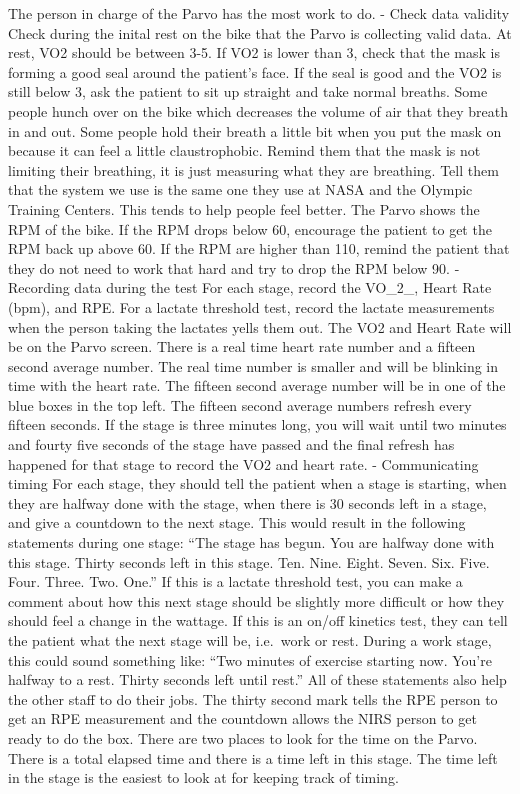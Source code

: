 \documentclass[
]{book}
\begin{document}
The person in charge of the Parvo has the most work to do.
- Check data validity
Check during the inital rest on the bike that the Parvo is collecting valid data. At rest, VO2 should be between 3-5. If VO2 is lower than 3, check that the mask is forming a good seal around the patient's face. If the seal is good and the VO2 is still below 3, ask the patient to sit up straight and take normal breaths. Some people hunch over on the bike which decreases the volume of air that they breath in and out. Some people hold their breath a little bit when you put the mask on because it can feel a little claustrophobic. Remind them that the mask is not limiting their breathing, it is just measuring what they are breathing. Tell them that the system we use is the same one they use at NASA and the Olympic Training Centers. This tends to help people feel better.
The Parvo shows the RPM of the bike. If the RPM drops below 60, encourage the patient to get the RPM back up above 60. If the RPM are higher than 110, remind the patient that they do not need to work that hard and try to drop the RPM below 90.
- Recording data during the test
For each stage, record the VO\_2\_, Heart Rate (bpm), and RPE. For a lactate threshold test, record the lactate measurements when the person taking the lactates yells them out. The VO2 and Heart Rate will be on the Parvo screen. There is a real time heart rate number and a fifteen second average number. The real time number is smaller and will be blinking in time with the heart rate. The fifteen second average number will be in one of the blue boxes in the top left. The fifteen second average numbers refresh every fifteen seconds. If the stage is three minutes long, you will wait until two minutes and fourty five seconds of the stage have passed and the final refresh has happened for that stage to record the VO2 and heart rate.
- Communicating timing
For each stage, they should tell the patient when a stage is starting, when they are halfway done with the stage, when there is 30 seconds left in a stage, and give a countdown to the next stage. This would result in the following statements during one stage: ``The stage has begun. You are halfway done with this stage. Thirty seconds left in this stage. Ten. Nine. Eight. Seven. Six. Five. Four. Three. Two. One.'' If this is a lactate threshold test, you can make a comment about how this next stage should be slightly more difficult or how they should feel a change in the wattage. If this is an on/off kinetics test, they can tell the patient what the next stage will be, i.e.~work or rest. During a work stage, this could sound something like: ``Two minutes of exercise starting now. You're halfway to a rest. Thirty seconds left until rest.'' All of these statements also help the other staff to do their jobs. The thirty second mark tells the RPE person to get an RPE measurement and the countdown allows the NIRS person to get ready to do the box.
There are two places to look for the time on the Parvo. There is a total elapsed time and there is a time left in this stage. The time left in the stage is the easiest to look at for keeping track of timing.
\end{document}
